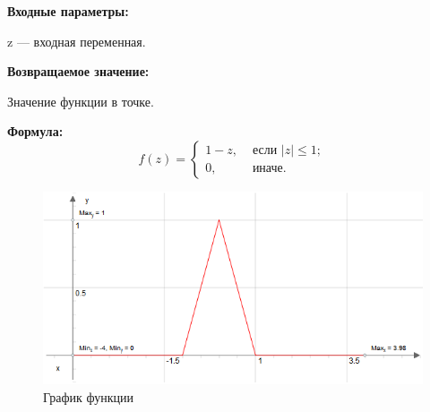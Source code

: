 \textbf{Входные параметры:}
 
z --- входная переменная.

\textbf{Возвращаемое значение:}
 
Значение функции в точке.

\textbf{Формула:}
\begin{equation*}
f\left(z \right)=\left\lbrace \begin{aligned} 1-z,& \text{ если } \left| z\right| \leq 1 ; \\ 0,& \text{ иначе}. \end{aligned}\right.
\end{equation*}

 \begin{figure} [h] 
   \center
   \includegraphics {HML_BellShapedKernelTriangle_Graph.png}
   \caption{График функции} 
   \label{img:HML_BellShapedKernelTriangle_Graph}  
 \end{figure}